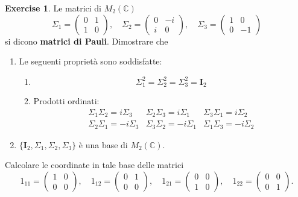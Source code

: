 \documentclass{article}
\theoremstyle{plain}
\theoremstyle{definition}
\newtheorem{xca}[exmp]{Exercise}
\theoremstyle{remark}
\begin{document}
\begin{bxthm}
\begin{xca}
    Le matrici di $M_2(\mathbb{C})$
    \[
    \Sigma_1=\begin{pmatrix} 0 & 1 \\ 1 & 0 \end{pmatrix},\quad
    \Sigma_2=\begin{pmatrix} 0 & -i \\ i & 0 \end{pmatrix},\quad
    \Sigma_3=\begin{pmatrix} 1 & 0 \\ 0 & -1 \end{pmatrix}
    \]
    si dicono \textbf{matrici di Pauli}. Dimostrare che 
    \begin{enumerate}
        \item Le seguenti proprietà sono soddisfatte:
            \begin{enumerate}
                \item \[\Sigma_1^2=\Sigma_2^2=\Sigma_3^2=\mathbf{I}_2 \]
                \item Prodotti ordinati:
                \[\begin{array}{lll}
                \Sigma_1\Sigma_2=i\Sigma_3 & \Sigma_2\Sigma_3=i\Sigma_1 & \Sigma_3\Sigma_1=i\Sigma_2 \\
                \Sigma_2\Sigma_1=-i\Sigma_3 & \Sigma_3\Sigma_2=-i\Sigma_1 & \Sigma_1\Sigma_3=-i\Sigma_2
                \end{array}\]
            \end{enumerate}
        \item $\{\mathbf{I}_2, \Sigma_1, \Sigma_2, \Sigma_3\}$ è una base di $M_2(\mathbb{C})$.
    \end{enumerate}
    Calcolare le coordinate in tale base delle matrici 
    \[1_{11}=\begin{pmatrix} 1 & 0 \\ 0 & 0 \end{pmatrix},\quad 1_{12}=\begin{pmatrix} 0 & 1 \\ 0 & 0 \end{pmatrix},\quad 1_{21}=\begin{pmatrix} 0 & 0 \\ 1 & 0 \end{pmatrix},\quad 1_{22}=\begin{pmatrix} 0 & 0 \\ 0 & 1 \end{pmatrix}.\]
\end{xca}
\end{bxthm}
\end{document}
